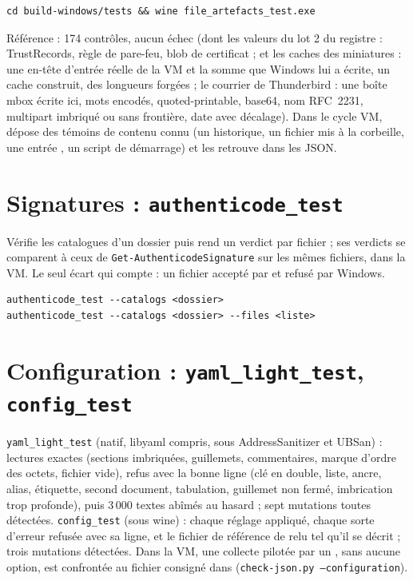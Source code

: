 \documentclass[11pt,a4paper,oneside]{report}
\begin{document}
\begin{lstlisting}
cd build-windows/tests && wine file_artefacts_test.exe
\end{lstlisting}

Référence : 174 contrôles, aucun échec (dont les valeurs du lot 2 du registre : TrustRecords, règle de pare-feu, blob de certificat ; et les caches des miniatures : une en-tête d'entrée réelle de la VM et la somme que Windows lui a écrite, un cache construit, des longueurs forgées ; le courrier de Thunderbird : une boîte mbox écrite ici, mots encodés, quoted-printable, base64, nom RFC~2231, multipart imbriqué ou sans frontière, date avec décalage). Dans le cycle VM,
 dépose des témoins de contenu connu (un
historique, un fichier mis à la corbeille, une entrée , un
script de démarrage) et  les retrouve dans les JSON.

\section{Signatures : \texttt{authenticode\_test}}

Vérifie les catalogues d'un dossier puis rend un verdict par fichier ; ses
verdicts se comparent à ceux de \texttt{Get-AuthenticodeSignature} sur les mêmes
fichiers, dans la VM. Le seul écart qui compte : un fichier accepté par \wac{}
et refusé par Windows.

\begin{lstlisting}
authenticode_test --catalogs <dossier>
authenticode_test --catalogs <dossier> --files <liste>
\end{lstlisting}

\section{Configuration : \texttt{yaml\_light\_test}, \texttt{config\_test}}

\texttt{yaml\_light\_test} (natif, libyaml compris, sous AddressSanitizer et
UBSan) : lectures exactes (sections imbriquées, guillemets, commentaires,
marque d'ordre des octets, fichier vide), refus avec la bonne ligne (clé en
double, liste, ancre, alias, étiquette, second document, tabulation, guillemet
non fermé, imbrication trop profonde), puis 3\,000 textes abîmés au hasard ;
sept mutations toutes détectées. \texttt{config\_test} (sous wine) : chaque
réglage appliqué, chaque sorte d'erreur refusée avec sa ligne, et le fichier
de référence de  relu tel qu'il se décrit ; trois mutations
détectées. Dans la VM, une collecte pilotée par un , sans
aucune option, est confrontée au fichier consigné dans
 (\texttt{check-json.py --configuration}).
\end{document}
